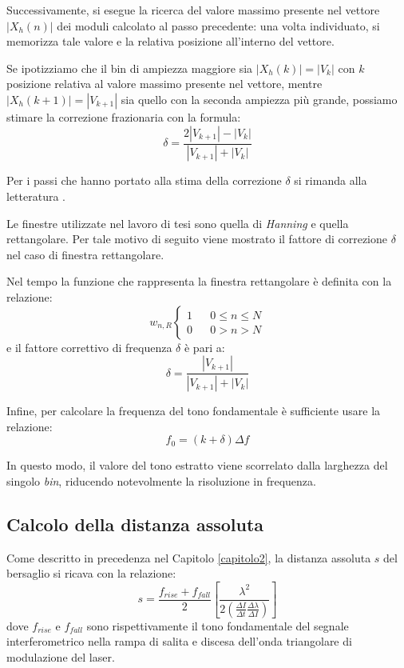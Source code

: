 Successivamente, si esegue la ricerca del valore massimo presente nel vettore $|X_h(n)|$ dei moduli calcolato al passo precedente: una volta individuato, si memorizza tale valore e la relativa posizione all'interno del vettore.

Se ipotizziamo che il bin di ampiezza maggiore sia $|X_h(k)|=|V_k|$ con $k$ posizione relativa al valore massimo presente nel vettore, mentre $|X_h(k+1)|=|V_{k+1}|$ sia quello con la seconda ampiezza più grande, possiamo stimare la correzione frazionaria  con la formula:
\begin{equation}
	\delta = \frac{2 |V_{k+1}|- |V_k|}{|V_{k+1}| + |V_k|}
\end{equation}

Per i passi che hanno portato alla stima della correzione $\delta$ si rimanda alla letteratura \cite{1007077}.

Le finestre utilizzate nel lavoro di tesi sono quella di \textit{Hanning} e quella rettangolare. Per tale motivo di seguito viene mostrato il fattore di correzione $\delta$ nel caso di finestra rettangolare.

Nel tempo la funzione che rappresenta la finestra rettangolare è definita con la relazione: 
\begin{equation}
w_{n,R}
\left\{\begin{matrix}
1 & & 0 \leq n \leq N \\ 
0  &  & 0 > n > N
\end{matrix}\right.
\end{equation}
e il fattore correttivo di frequenza $\delta$ è pari a:
\begin{equation}
	\delta = \frac{|V_{k+1}|}{|V_{k+1}| + |V_k|}
\end{equation}

Infine, per calcolare la frequenza del tono fondamentale è sufficiente usare la relazione: 
\begin{equation}
	f_0 = (k + \delta)\Delta f
\end{equation}

In questo modo, il valore del tono estratto viene scorrelato dalla larghezza del singolo \textit{bin}, riducendo notevolmente la risoluzione in frequenza. 

\subsection{Calcolo della distanza assoluta}
Come descritto in precedenza nel Capitolo \ref{capitolo2}, la distanza assoluta $s$ del bersaglio si ricava con la relazione:
\begin{equation}
	s = \frac{f_{rise}+f_{fall}}{2} \left [ \frac{\lambda^2}{2\left ( \frac{\Delta I}{\Delta t} \frac{\Delta \lambda}{\Delta I} \right )}  \right ]
\end{equation}
dove $f_{rise}$ e $f_{fall}$ sono rispettivamente il tono fondamentale del segnale interferometrico nella rampa di salita e discesa dell'onda triangolare di modulazione del laser.

